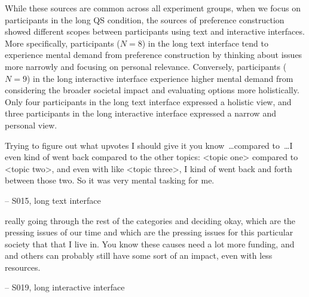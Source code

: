 While these sources are common across all experiment groups, when we focus on participants in the long QS condition, the sources of preference construction showed different scopes between participants using text and interactive interfaces. More specifically, participants ($N=8$) in the long text interface tend to experience mental demand from preference construction by thinking about issues more narrowly and focusing on personal relevance. Conversely, participants ($N=9$) in the long interactive interface experience higher mental demand from considering the broader societal impact and evaluating options more holistically. Only four participants in the long text interface expressed a holistic view, and three participants in the long interactive interface expressed a narrow and personal view.

    

\begin{displayquote}
Trying to figure out what upvotes I should give it you know~\ldots compared to~\ldots I even kind of went back compared to the other topics: <topic one> compared to <topic two>, and even with like <topic three>, I kind of went back and forth between those two. \bracketellipsis So it was very mental tasking for me.

\noindent \hfill -- S015, long text interface
\end{displayquote}

    

\begin{displayquote}
\bracketellipsis really going through the rest of the categories and deciding okay, which are the pressing issues of our time and which are the pressing issues for this particular society that that I live in. \bracketellipsis You know these causes need a lot more funding, and and others can probably still have some sort of an impact, even with less resources.

\noindent \hfill -- S019, long interactive interface
\end{displayquote}

